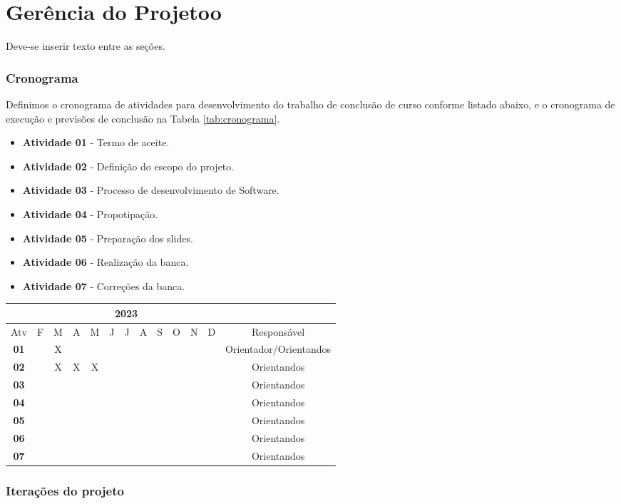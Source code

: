 \chapter{Gerência do Projetoo}\label{cap:desenvolvimento}
Deve-se inserir texto entre as seções.
\subsection{Cronograma}

Definimos o cronograma de atividades para desenvolvimento do trabalho de conclusão de curso conforme listado abaixo, e o cronograma de execução e previsões de conclusão na Tabela \ref{tab:cronograma}.

\begin{itemize}
    \item \textbf{Atividade 01} - Termo de aceite.
    \item \textbf{Atividade 02} - Definição do escopo do projeto.
    \item \textbf{Atividade 03} - Processo de desenvolvimento de Software.
    \item \textbf{Atividade 04} - Propotipação.
    \item \textbf{Atividade 05} - Preparação dos slides.
    \item \textbf{Atividade 06} - Realização da banca.
    \item \textbf{Atividade 07} - Correções da banca.
\end{itemize}

\begin{table*}[ht]
\centering
\caption{Cronograma das atividades}
\label{tab:cronograma}
\begin{tabular}{|c|c|c|c|c|c|c|c|c|c|c|c|c|}
\hline & \multicolumn{11}{|c|}{2023} & \multicolumn{1}{|c|}{} \\
\hline \multicolumn{1}{|c|}{Atv} & F & M & A & M & J & J & A & S & O & N & D & {Responsável} \\
\hline \textbf{01} & & X& & & & & & & & & & Orientador/Orientandos \\
\hline \textbf{02} & & X& X& X& & & & & & & & Orientandos \\
\hline \textbf{03} & & & & & & & & & & & & Orientandos\\
\hline \textbf{04} & & & & & & & & & & & & Orientandos\\
\hline \textbf{05} & & & & & & & & & & & & Orientandos\\
\hline \textbf{06} & & & & & & & & & & & & Orientandos\\
\hline \textbf{07} & & & & & & & & & & & & Orientandos\\
\hline
\end{tabular} 
\end{table*}

\subsection{Iterações do projeto}